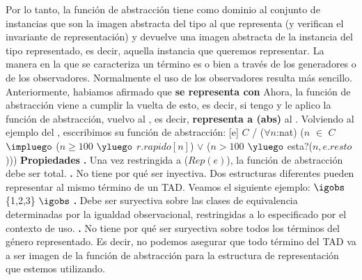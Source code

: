\documentclass[10pt,a4paper]{article}
\begin{document}
\newline
Por lo tanto, la función de abstracción tiene como dominio al conjunto de instancias que son la imagen abstracta del tipo al que representa (y verifican el invariante de representación) y devuelve una imagen abstracta de la instancia del tipo representado, es decir, aquella instancia que queremos representar.
\newline
\newline
La manera en la que se caracteriza un término es o bien a través de los generadores o de los observadores. Normalmente el uso de los observadores resulta más sencillo.
\newpage
Anteriormente, habiamos afirmado que  \textbf{se representa con}  
\newline
\newline
Ahora, la función de abstracción viene a cumplir la vuelta de esto, es decir, si tengo  y le aplico la función de abstracción, vuelvo al , es decir,  \textbf{representa a (abs)} al  .
\newline
\newline
Volviendo al ejemplo del , esccribimos su función de abstracción:
\newline
{}[e]{ $C$ / ($\forall n$:nat) ($n$ $\in$ $C$ $\impluego$ ($n \geq 100$ $\yluego$ $r.rapido[n]$) $\lor$ ($n > 100$ $\yluego$ esta?($n,e.resto$)))}
\medskip
\medskip
\textbf{Propiedades}
\newline
\newline
\textbf{.} Una vez restringida a ($Rep(e)$), la función de abstracción debe ser total.
\newline
\newline
\textbf{.} No tiene por qué ser inyectiva. Dos estructuras diferentes pueden representar al mismo término de un TAD. Veamos el siguiente ejemplo:
\newline
\newline
{}
\newline
\newline
{} $\igobs$ \{1,2,3\} $\igobs$ 
\newline
\newline
\textbf{.} Debe ser suryectiva sobre las clases de equivalencia determinadas por la igualdad observacional, restringidas a lo especificado por el contexto de uso.
\newline
\newline
\textbf{.} No tiene por qué ser suryectiva sobre todos los términos del género representado. Es decir, no podemos asegurar que todo término del TAD va a ser imagen de la función de abstracción para la estructura de representación que estemos utilizando.  
\end{document}
